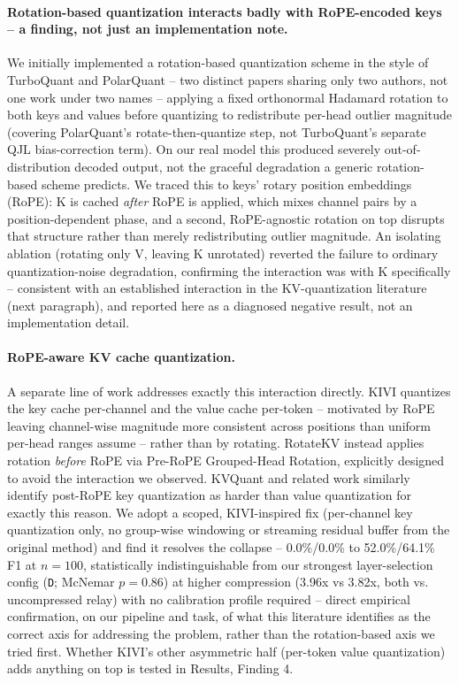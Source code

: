 \documentclass[11pt]{article}
\begin{document}
\paragraph{Rotation-based quantization interacts badly with RoPE-encoded
keys -- a finding, not just an implementation note.} We initially
implemented a rotation-based quantization scheme in the style of
TurboQuant \citep{turboquant2026} and PolarQuant \citep{polarquant2026} --
two distinct papers sharing only two authors, not one work under two
names -- applying a fixed orthonormal Hadamard rotation to both keys and
values before quantizing to redistribute per-head outlier magnitude
(covering PolarQuant's rotate-then-quantize step, not TurboQuant's
separate QJL bias-correction term). On our real model this produced
severely out-of-distribution decoded output, not the graceful degradation
a generic rotation-based scheme predicts. We traced this to keys' rotary
position embeddings (RoPE): K is cached \emph{after} RoPE is applied,
which mixes channel pairs by a position-dependent phase, and a second,
RoPE-agnostic rotation on top disrupts that structure rather than merely
redistributing outlier magnitude. An isolating ablation (rotating only V,
leaving K unrotated) reverted the failure to ordinary quantization-noise
degradation, confirming the interaction was with K specifically --
consistent with an established interaction in the KV-quantization
literature (next paragraph), and reported here as a diagnosed negative
result, not an implementation detail.

\paragraph{RoPE-aware KV cache quantization.} A separate line of work
addresses exactly this interaction directly. KIVI \citep{kivi2024}
quantizes the key cache per-channel and the value cache per-token --
motivated by RoPE leaving channel-wise magnitude more consistent across
positions than uniform per-head ranges assume -- rather than by rotating.
RotateKV \citep{rotatekv2025} instead applies rotation \emph{before} RoPE
via Pre-RoPE Grouped-Head Rotation, explicitly designed to avoid the
interaction we observed. KVQuant \citep{kvquant2024} and related work
similarly identify post-RoPE key quantization as harder than value
quantization for exactly this reason. We adopt a scoped, KIVI-inspired fix
(per-channel key quantization only, no group-wise windowing or streaming
residual buffer from the original method) and find it resolves the
collapse -- 0.0\%/0.0\% to 52.0\%/64.1\% F1 at $n=100$, statistically
indistinguishable from our strongest layer-selection config (\texttt{D};
McNemar $p=0.86$) at higher compression (3.96x vs 3.82x, both vs.
uncompressed relay) with no calibration profile required -- direct
empirical confirmation, on our pipeline and task, of what this literature
identifies as the correct
axis for addressing the problem, rather than the rotation-based axis we
tried first. Whether KIVI's other asymmetric half (per-token value
quantization) adds anything on top is tested in Results, Finding 4.
\end{document}
